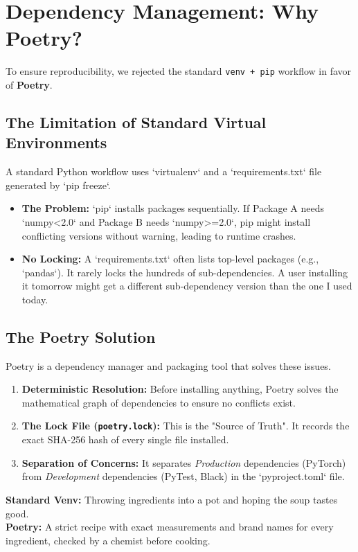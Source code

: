 \documentclass[11pt, a4paper]{article}
\begin{document}
\section{Dependency Management: Why Poetry?}

To ensure reproducibility, we rejected the standard \texttt{venv + pip} workflow in favor of \textbf{Poetry}.

\subsection{The Limitation of Standard Virtual Environments}
A standard Python workflow uses `virtualenv` and a `requirements.txt` file generated by `pip freeze`.
\begin{itemize}
    \item \textbf{The Problem:} `pip` installs packages sequentially. If Package A needs `numpy<2.0` and Package B needs `numpy>=2.0`, pip might install conflicting versions without warning, leading to runtime crashes.
    \item \textbf{No Locking:} A `requirements.txt` often lists top-level packages (e.g., `pandas`). It rarely locks the hundreds of sub-dependencies. A user installing it tomorrow might get a different sub-dependency version than the one I used today.
\end{itemize}

\subsection{The Poetry Solution}
Poetry is a dependency manager and packaging tool that solves these issues. 

\begin{enumerate}
    \item \textbf{Deterministic Resolution:} Before installing anything, Poetry solves the mathematical graph of dependencies to ensure no conflicts exist.
    \item \textbf{The Lock File (\texttt{poetry.lock}):} This is the "Source of Truth". It records the exact SHA-256 hash of every single file installed. 
    \item \textbf{Separation of Concerns:} It separates \textit{Production} dependencies (PyTorch) from \textit{Development} dependencies (PyTest, Black) in the `pyproject.toml` file.
\end{enumerate}

\begin{tcolorbox}[colback=green!5!white,colframe=green!75!black,title=Analogy]
    \textbf{Standard Venv:} Throwing ingredients into a pot and hoping the soup tastes good.\\
    \textbf{Poetry:} A strict recipe with exact measurements and brand names for every ingredient, checked by a chemist before cooking.
\end{tcolorbox}
\end{document}

